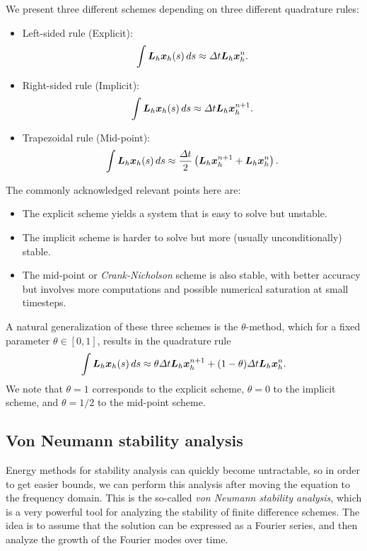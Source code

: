\documentclass{article}
\renewcommand{\vec}{\vectorsym}
\newcommand{\mat}{\matrixsym}
\begin{document}
    We present three different schemes depending on three different quadrature rules: 
    \begin{itemize}
        \item Left-sided rule (Explicit):
                $$ \int \mat L_h \vec x_h(s)\,ds \approx \Delta t \mat L_h\vec x_h^n. $$
        \item  Right-sided rule (Implicit): 
            $$ \int \mat L_h \vec x_h(s)\,ds \approx \Delta t\mat L_h\vec x_h^{n+1}. $$
        \item  Trapezoidal rule (Mid-point): 
            $$ \int \mat L_h \vec x_h(s)\,ds \approx \frac{\Delta t}{2}\left(\mat L_h\vec x_h^{n+1}+ \mat L_h \vec x_h^n\right). $$
    \end{itemize}
    The commonly acknowledged relevant points here are: 
    \begin{itemize}
        \item The explicit scheme yields a system that is easy to solve but unstable.
        \item The implicit scheme is harder to solve but more (usually unconditionally) stable.
        \item The mid-point or \emph{Crank-Nicholson} scheme is also stable, with better accuracy but involves more computations and possible numerical saturation at small timesteps.
    \end{itemize}

    A natural generalization of these three schemes is the $\theta$-method, which for a fixed parameter $\theta\in[0,1]$, results in the quadrature rule
    $$\int \mat L_h \vec x_h(s)\,ds \approx \theta\Delta t \mat L_h\vec x_h^{n+1} + (1-\theta)\Delta t \mat L_h \vec x_h^n. $$
    We note that $\theta=1$ corresponds to the explicit scheme, $\theta=0$ to the implicit scheme, and $\theta=1/2$ to the mid-point scheme. 
    
\subsection{Von Neumann stability analysis}
Energy methods for stability analysis can quickly become untractable, so in order to get easier bounds, we can perform this analysis after moving the equation to the frequency domain. This is the so-called \emph{von Neumann stability analysis}, which is a very powerful tool for analyzing the stability of finite difference schemes. The idea is to assume that the solution can be expressed as a Fourier series, and then analyze the growth of the Fourier modes over time.
\end{document}
